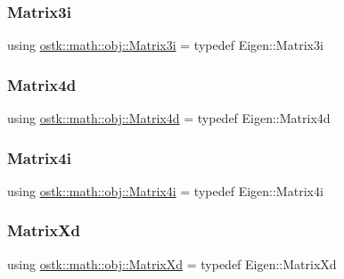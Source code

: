 \subsubsection{\texorpdfstring{Matrix3i}{Matrix3i}}
{\footnotesize\ttfamily using \hyperlink{namespaceostk_1_1math_1_1obj_a21413c9f36b149c4bb9cdf407a6c95e7}{ostk\+::math\+::obj\+::\+Matrix3i} = typedef Eigen\+::\+Matrix3i}

\mbox{\label{namespaceostk_1_1math_1_1obj_a178d5237467762d8b20ed6ed2dd3d096}} 
\subsubsection{\texorpdfstring{Matrix4d}{Matrix4d}}
{\footnotesize\ttfamily using \hyperlink{namespaceostk_1_1math_1_1obj_a178d5237467762d8b20ed6ed2dd3d096}{ostk\+::math\+::obj\+::\+Matrix4d} = typedef Eigen\+::\+Matrix4d}

\mbox{\label{namespaceostk_1_1math_1_1obj_aca98b6e5d7e788f61ca7a026bc970de1}} 
\subsubsection{\texorpdfstring{Matrix4i}{Matrix4i}}
{\footnotesize\ttfamily using \hyperlink{namespaceostk_1_1math_1_1obj_aca98b6e5d7e788f61ca7a026bc970de1}{ostk\+::math\+::obj\+::\+Matrix4i} = typedef Eigen\+::\+Matrix4i}

\mbox{\label{namespaceostk_1_1math_1_1obj_a2e17f4d2058bd34d8b17b8ab90980d5e}} 
\subsubsection{\texorpdfstring{Matrix\+Xd}{MatrixXd}}
{\footnotesize\ttfamily using \hyperlink{namespaceostk_1_1math_1_1obj_a2e17f4d2058bd34d8b17b8ab90980d5e}{ostk\+::math\+::obj\+::\+Matrix\+Xd} = typedef Eigen\+::\+Matrix\+Xd}

\mbox{\label{namespaceostk_1_1math_1_1obj_aca824852c53eba10924e5f0fb80cbb87}} 
